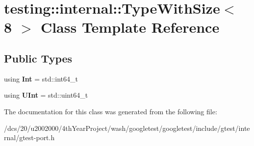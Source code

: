 \hypertarget{classtesting_1_1internal_1_1TypeWithSize_3_018_01_4}{}\section{testing\+:\+:internal\+:\+:Type\+With\+Size$<$ 8 $>$ Class Template Reference}
\label{classtesting_1_1internal_1_1TypeWithSize_3_018_01_4}
\subsection*{Public Types}
\begin{DoxyCompactItemize}
\item 
\mbox{\label{classtesting_1_1internal_1_1TypeWithSize_3_018_01_4_a2af112faa047824cb97139f36a807ed1}} 
using {\bfseries Int} = std\+::int64\+\_\+t
\item 
\mbox{\label{classtesting_1_1internal_1_1TypeWithSize_3_018_01_4_a6ca15a23e9bf6634c9ba0535317cb989}} 
using {\bfseries U\+Int} = std\+::uint64\+\_\+t
\end{DoxyCompactItemize}


The documentation for this class was generated from the following file\+:\begin{DoxyCompactItemize}
\item 
/dcs/20/u2002000/4th\+Year\+Project/wash/googletest/googletest/include/gtest/internal/gtest-\/port.\+h\end{DoxyCompactItemize}
